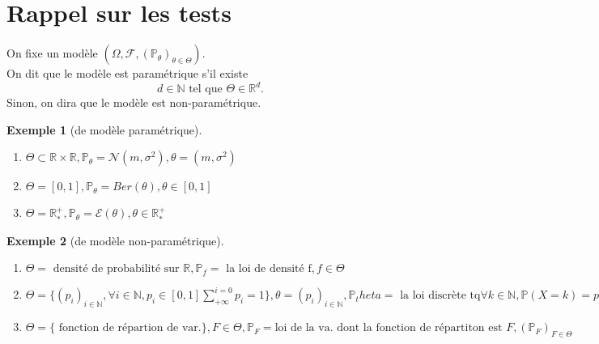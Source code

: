 \documentclass{article}
\theoremstyle{plain}%
\theoremstyle{definition}
\newtheorem{exmp}{Exemple}[section]
\theoremstyle{remark}
\begin{document}
\section{Rappel sur les tests}
On fixe un modèle $ (\Omega , \mathcal{F}, (\mathbb{P}_\theta )_{\theta \in \Theta}) $.\\
On dit que le modèle est paramétrique s'il existe 
\[
    d \in \mathbb{N} \text{ tel que } \Theta \in \mathbb{R}^d
.\]
Sinon, on dira que le modèle est non-paramétrique. 
\begin{exmp}[de modèle paramétrique]
    \begin{enumerate}
        \item $ \Theta \subset \mathbb{R} \times \mathbb{R}, \mathbb{P}_\theta = \mathcal{N}(m, \sigma ^2), \theta = (m, \sigma ^2)$ 
        \item $ \Theta = [0,1], \mathbb{P}_\theta = Ber(\theta ), \theta \in [0,1] $ 
        \item $ \Theta = \mathbb{R}^+_*, \mathbb{P}_\theta = \mathcal{E}(\theta ), \theta \in \mathbb{R}^+_* $ 
    \end{enumerate}
\end{exmp}
\begin{exmp}[de modèle non-paramétrique]
    \begin{enumerate}
        \item $ \Theta = \text{ densité de probabilité sur } \mathbb{R}, \mathbb{P}_f = \text{ la loi de densité f}, f \in \Theta  $ 
        \item $ \Theta = \{(p_i)_{i \in \mathbb{N}}, \forall i \in \mathbb{N}, p_i \in [0,1] \sum_{+\infty}^{i=0} p_i = 1\}, \theta = (p_i)_{i \in \mathbb{N}}, \mathbb{P}_theta = \text{ la loi discrète tq} \forall k \in \mathbb{N}, \mathbb{P}(X=k) = p_k , $ 
        \item $ \Theta = \{ \text{ fonction de répartion de var.}\}, F \in \Theta,  \mathbb{P}_F = \text{loi de la va. dont la fonction de répartiton est } F, (\mathbb{P}_F)_{F \in \Theta } $ 
    \end{enumerate}
\end{exmp}
\end{document}
